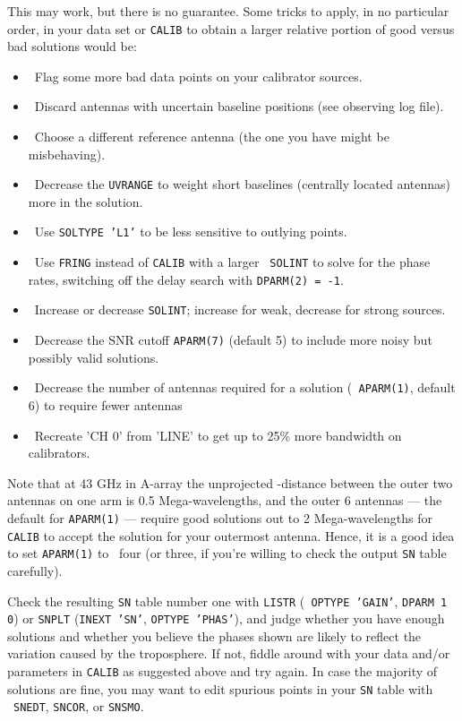 This may work, but there is no guarantee. Some tricks to apply, in no
particular order, in your data set or {\tt CALIB} to obtain a larger
relative portion of good versus bad solutions would
be:
\begin{itemize}
\item\ Flag some more bad data points on your calibrator sources.
\item\ Discard antennas with uncertain baseline positions (see
       observing log file).
\item\ Choose a different reference antenna (the one you have might be
       misbehaving).
\item\ Decrease the {\tt UVRANGE} to weight short baselines (centrally
       located antennas) more in the solution.
\item\ Use {\tt SOLTYPE 'L1'} to be less sensitive to outlying points.
\item\ Use {\tt FRING} instead of {\tt CALIB} with a larger {\tt
       SOLINT} to solve for the phase rates, switching off the delay
       search with {\tt DPARM(2) = -1}.
\item\ Increase or decrease {\tt SOLINT}; increase for weak, decrease
       for strong sources.
\item\ Decrease the SNR cutoff {\tt APARM(7)} (default 5) to include
       more noisy but possibly valid solutions.
\item\ Decrease the number of antennas required for a solution ({\tt
       APARM(1)}, default 6) to require fewer antennas
\item\ Recreate 'CH 0' from 'LINE' to get up to 25\% more bandwidth on
       calibrators.
\end{itemize}

Note that at 43 GHz in A-array the unprojected \uv-distance between
the outer two antennas on one arm is 0.5 Mega-wavelengths, and the
outer 6 antennas --- the default for {\tt APARM(1)} --- require good
solutions out to 2 Mega-wavelengths for {\tt CALIB} to accept the
solution for your outermost antenna. Hence, it is a good idea to set
{\tt APARM(1)} to \eg\ four (or three, if you're willing to check
the output {\tt SN} table carefully).

Check the resulting {\tt SN} table number one with {\tt LISTR} ({\tt
OPTYPE 'GAIN'}, {\tt DPARM 1 0}) or {\tt SNPLT} ({\tt INEXT 'SN'},
{\tt OPTYPE 'PHAS'}), and judge whether you have enough solutions and
whether you believe the phases shown are likely to reflect the
variation caused by the troposphere. If not, fiddle around with your
data and/or parameters in {\tt CALIB} as suggested above and try
again. In case the majority of solutions are fine, you may want to
edit spurious points in your {\tt SN} table with \eg\ {\tt SNEDT},
{\tt SNCOR}, or {\tt SNSMO}\@.

